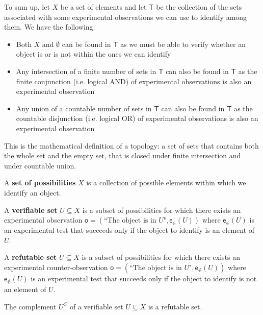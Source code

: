 \documentclass[11pt,letterpaper,fleqn]{memoir} %
\begin{document}
To sum up, let $X$ be a set of elements and let $\mathsf{T}$ be the collection of the sets associated with some experimental observations we can use to identify among them. We have the following:
\begin{itemize}
	\item Both $X$ and $\emptyset$ can be found in $\mathsf{T}$ as we must be able to verify whether an object is or is not within the ones we can identify
	\item Any intersection of a finite number of sets in $\mathsf{T}$ can also be found in $\mathsf{T}$ as the finite conjunction (i.e. logical AND) of experimental observations is also an experimental observation
	\item Any union of a countable number of sets in $\mathsf{T}$ can also be found in $\mathsf{T}$ as the countable disjunction (i.e. logical OR) of experimental observations is also an experimental observation
\end{itemize}
This is the mathematical definition of a topology: a set of sets that contains both the whole set and the empty set, that is closed under finite intersection and under countable union.

\begin{defn}
	A \textbf{set of possibilities} $X$ is a collection of possible elements within which we identify an object.
\end{defn}

\begin{defn}
	A \textbf{verifiable set} $U \subseteq X$ is a subset of possibilities for which there exists an experimental observation $\mathsf{o} = (\text{``The object is in } U \text{"}, \mathsf{e}_\in(U))$ where $\mathsf{e}_\in(U)$ is an experimental test that succeeds only if the object to identify is an element of $U$.
\end{defn}

\begin{defn}
	A \textbf{refutable set} $U \subseteq X$ is a subset of possibilities for which there exists an experimental counter-observation $\mathsf{o} = (\text{``The object is in } U \text{"}, \mathsf{e}_{\notin}(U))$ where $\mathsf{e}_{\notin}(U)$ is an experimental test that succeeds only if the object to identify is not an element of $U$.
\end{defn}

\begin{prop}
	The complement $U^C$ of a verifiable set $U \subseteq X$ is a refutable set.
\end{prop}
\end{document}
